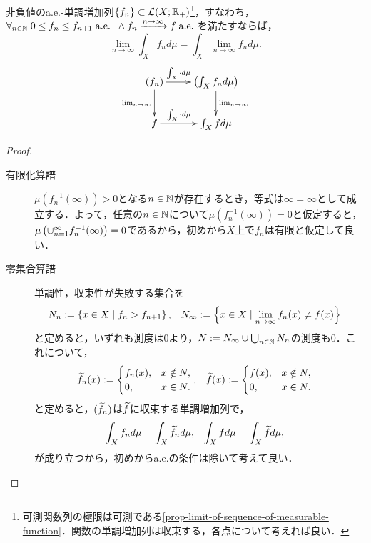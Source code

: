 \documentclass[uplatex, dvipdfmx]{jsreport}
\begin{document}
\begin{theorem}\label{thm-monotone-convergence-theorem}
    非負値のa.e.-単調増加列$\{f_n\}\subset\mathcal{L}(X;\mathbb{R}_+)$\footnote{可測関数列の極限は可測である\ref{prop-limit-of-sequence-of-measurable-function}．関数の単調増加列は収束する，各点について考えれば良い．}，すなわち，$\forall_{n\in\mathbb{N}}\;0\le f_n\le f_{n+1}\;\mathrm{a.e.}\;\;\land f_n\xrightarrow{n\to\infty}f\;\mathrm{a.e.}\;$を満たすならば，
    \[\lim_{n\to\infty}\int_Xf_nd\mu=\int_X\lim_{n\to\infty}f_nd\mu.\]
    \[\xymatrix{
        (f_n)\ar[r]^-{\int_X\cdot d\mu}\ar[d]_-{\lim_{n\to\infty}}&\paren{\int_Xf_nd\mu}\ar[d]^-{\lim_{n\to\infty}}\\
        f\ar[r]^-{\int_X\cdot d\mu}&\int_Xfd\mu
    }\]
\end{theorem}
\begin{proof}\mbox{}
    \begin{description}
        \item[有限化算譜] $\mu(f_n^{-1}(\infty))>0$となる$n\in\mathbb{N}$が存在するとき，等式は$\infty=\infty$として成立する．よって，任意の$n\in\mathbb{N}$について$\mu(f_n^{-1}(\infty))=0$と仮定すると，$\mu\left(\cup_{n=1}^\infty f_n^{-1}(\infty)\right)=0$であるから，初めから$X$上で$f_n$は有限と仮定して良い．
        \item[零集合算譜] 単調性，収束性が失敗する集合を
        \begin{align*}
            N_n&:=\left\{x\in X\mid f_n>f_{n+1}\right\},&N_\infty&:=\left\{x\in X\mid\lim_{n\to\infty}f_n(x)\ne f(x)\right\}
        \end{align*}
        と定めると，いずれも測度は$0$より，$N:=N_\infty\cup\bigcup_{n\in\mathbb{N}}N_n$の測度も$0$．これについて，
        \begin{align*}
            \widetilde{f}_n(x)&:=\begin{cases}
                f_n(x),&x\notin N,\\
                0,&x\in N.
            \end{cases},&\widetilde{f}(x)&:=\begin{cases}
                f(x),&x\notin N,\\
                0,&x\in N.
            \end{cases}
        \end{align*}
        と定めると，$(\widetilde{f}_n)$は$\widetilde{f}$に収束する単調増加列で，
        \begin{align*}
            \int_Xf_nd\mu&=\int_X\widetilde{f}_nd\mu,&\int_Xfd\mu&=\int_X\widetilde{f}d\mu,
        \end{align*}
        が成り立つから，初めからa.e.の条件は除いて考えて良い．

\end{description}
\end{proof}
\end{document}
